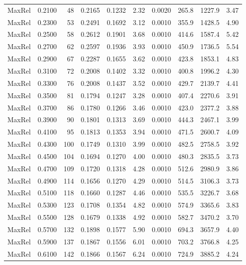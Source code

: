 {\begin{longtable}{lrrrrrrrrr}
  MaxRel & 0.2100 & 48 & 0.2165 & 0.1232 & 2.32 & 0.0020 & 265.8 & 1227.9 & 3.47 \\
  MaxRel & 0.2300 & 53 & 0.2491 & 0.1692 & 3.12 & 0.0010 & 355.9 & 1428.5 & 4.90 \\
  MaxRel & 0.2500 & 58 & 0.2612 & 0.1901 & 3.68 & 0.0010 & 414.6 & 1587.4 & 5.42 \\
  MaxRel & 0.2700 & 62 & 0.2597 & 0.1936 & 3.93 & 0.0010 & 450.9 & 1736.5 & 5.54 \\
  MaxRel & 0.2900 & 67 & 0.2287 & 0.1655 & 3.62 & 0.0010 & 423.8 & 1853.1 & 4.83 \\
  MaxRel & 0.3100 & 72 & 0.2008 & 0.1402 & 3.32 & 0.0010 & 400.8 & 1996.2 & 4.30 \\
  MaxRel & 0.3300 & 76 & 0.2008 & 0.1437 & 3.52 & 0.0010 & 429.7 & 2139.7 & 4.41 \\
  MaxRel & 0.3500 & 81 & 0.1794 & 0.1247 & 3.28 & 0.0010 & 407.4 & 2270.6 & 3.91 \\
  MaxRel & 0.3700 & 86 & 0.1780 & 0.1266 & 3.46 & 0.0010 & 423.0 & 2377.2 & 3.88 \\
  MaxRel & 0.3900 & 90 & 0.1801 & 0.1313 & 3.69 & 0.0010 & 444.3 & 2467.1 & 3.99 \\
  MaxRel & 0.4100 & 95 & 0.1813 & 0.1353 & 3.94 & 0.0010 & 471.5 & 2600.7 & 4.09 \\
  MaxRel & 0.4300 & 100 & 0.1749 & 0.1310 & 3.99 & 0.0010 & 482.5 & 2758.5 & 3.92 \\
  MaxRel & 0.4500 & 104 & 0.1694 & 0.1270 & 4.00 & 0.0010 & 480.3 & 2835.5 & 3.73 \\
  MaxRel & 0.4700 & 109 & 0.1720 & 0.1318 & 4.28 & 0.0010 & 512.6 & 2980.9 & 3.86 \\
  MaxRel & 0.4900 & 114 & 0.1656 & 0.1270 & 4.29 & 0.0010 & 514.5 & 3106.3 & 3.73 \\
  MaxRel & 0.5100 & 118 & 0.1660 & 0.1287 & 4.46 & 0.0010 & 535.5 & 3226.7 & 3.68 \\
  MaxRel & 0.5300 & 123 & 0.1708 & 0.1354 & 4.82 & 0.0010 & 574.9 & 3365.6 & 3.83 \\
  MaxRel & 0.5500 & 128 & 0.1679 & 0.1338 & 4.92 & 0.0010 & 582.7 & 3470.2 & 3.70 \\
  MaxRel & 0.5700 & 132 & 0.1898 & 0.1577 & 5.90 & 0.0010 & 694.3 & 3657.9 & 4.40 \\
  MaxRel & 0.5900 & 137 & 0.1867 & 0.1556 & 6.01 & 0.0010 & 703.2 & 3766.8 & 4.25 \\
  MaxRel & 0.6100 & 142 & 0.1866 & 0.1567 & 6.24 & 0.0010 & 724.9 & 3885.2 & 4.24 \\

\end{longtable}}
